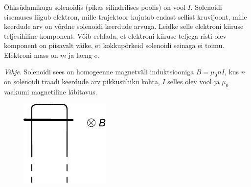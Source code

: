 \documentclass[10pt]{article}
\begin{document}
{%

Õhksüdamikuga solenoidis (pikas silindrilises poolis) on vool
$I$. Solenoidi sisemuses liigub elektron, mille trajektoor kujutab endast sellist
kruvijoont, mille keerdude arv on võrdne solenoidi keerdude arvuga. Leidke
selle elektroni kiiruse teljesihiline komponent. Võib eeldada, et elektroni kiiruse teljega risti olev komponent on piisavalt väike, et kokkupõrkeid solenoidi
seinaga ei toimu. Elektroni mass on $m$ ja laeng $e$.

\emph{Vihje}. Solenoidi sees on
homogeenne magnetväli induktsiooniga $B = \mu_0nI$, kus $n$ on solenoidi traadi
keerdude arv pikkusühiku kohta, $I$ selles olev vool ja $\mu_0$ vaakumi magnetiline
läbitavus.
\probend
\bigskip


\begin{figure}
	\vspace{-20pt}	
	\begin{center}
		\includegraphics[width=0.9\linewidth]{2011-v2g-08-yl}
	\end{center}
	\vspace{-20pt}
\end{figure}

}
\end{document}
